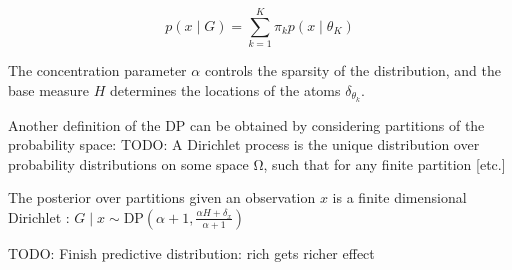 \documentclass[twoside]{article}
\newcommand{\DP}{\mathrm{DP}}
\newcommand{\todo}[1]{{\color{red} TODO: #1}}
\begin{document}
$$ p(x \mid G) = \sum_{k=1}^K \pi_k p(x \mid \theta_K) $$

The concentration parameter $\alpha$ controls the sparsity of the distribution, and the base measure $H$ determines the locations of the atoms $\delta_{\theta_k}$.

Another definition of the DP can be obtained by considering partitions of the probability space: \todo{A Dirichlet process is the unique distribution over probability distributions on some space Ω, such that for any finite partition [etc.]}

The posterior over partitions given an observation $x$ is a finite dimensional Dirichlet :
$ G \mid x \sim \DP(\alpha+1, \frac{\alpha H + \delta_x}{\alpha + 1})$

\todo{Finish predictive distribution: rich gets richer effect}
\end{document}
